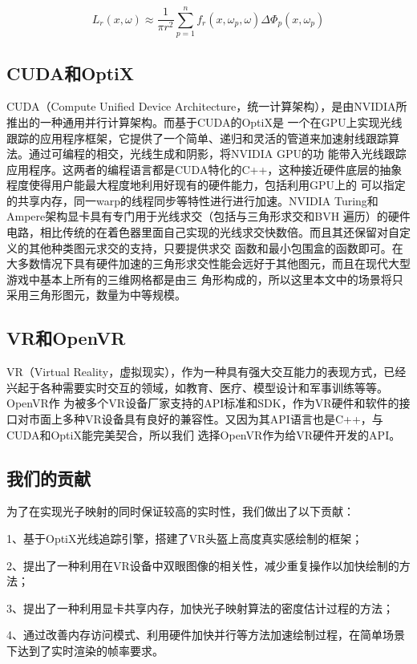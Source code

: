 \documentclass[UTF8]{ctexart}
\begin{document}
        \begin{equation}
        L_r(x,\omega)\approx\frac{1}{\pi r^2}\sum_{p=1}^nf_r(x,\omega_p,\omega)\Delta\Phi_p(x,\omega_p)
        \label{equ:1}
        \end{equation}
    \subsection{CUDA和OptiX}
        CUDA（Compute Unified Device Architecture，统一计算架构），是由NVIDIA所推出的一种通用并行计算架构。而基于CUDA的OptiX\cite{2010OptiX}是
        一个在GPU上实现光线跟踪的应用程序框架，它提供了一个简单、递归和灵活的管道来加速射线跟踪算法。通过可编程的相交，光线生成和阴影，将NVIDIA GPU的功
        能带入光线跟踪应用程序。这两者的编程语言都是CUDA特化的C++，这种接近硬件底层的抽象程度使得用户能最大程度地利用好现有的硬件能力，包括利用GPU上的
        可以指定的共享内存，同一warp的线程同步等特性进行进行加速。NVIDIA Turing和Ampere架构显卡具有专门用于光线求交（包括与三角形求交和BVH
        遍历）的硬件电路，相比传统的在着色器里面自己实现的光线求交快数倍。而且其还保留对自定义的其他种类图元求交的支持，只要提供求交
        函数和最小包围盒的函数即可。在大多数情况下具有硬件加速的三角形求交性能会远好于其他图元，而且在现代大型游戏中基本上所有的三维网格都是由三
        角形构成的，所以这里本文中的场景将只采用三角形图元，数量为中等规模。
    \subsection{VR和OpenVR}
        VR（Virtual Reality，虚拟现实），作为一种具有强大交互能力的表现方式，已经兴起于各种需要实时交互的领域，如教育、医疗、模型设计和军事训练等等。OpenVR作
        为被多个VR设备厂家支持的API标准和SDK，作为VR硬件和软件的接口对市面上多种VR设备具有良好的兼容性。又因为其API语言也是C++，与CUDA和OptiX能完美契合，所以我们
        选择OpenVR作为给VR硬件开发的API。
    \subsection{我们的贡献}
        为了在实现光子映射的同时保证较高的实时性，我们做出了以下贡献：

        1、基于OptiX光线追踪引擎，搭建了VR头盔上高度真实感绘制的框架；

        2、提出了一种利用在VR设备中双眼图像的相关性，减少重复操作以加快绘制的方法；

        3、提出了一种利用显卡共享内存，加快光子映射算法的密度估计过程的方法；

        4、通过改善内存访问模式、利用硬件加快并行等方法加速绘制过程，在简单场景下达到了实时渲染的帧率要求。
\end{document}
